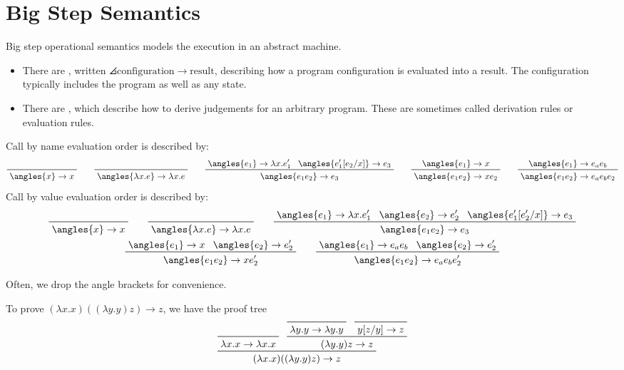 \documentclass[class=scrartcl]{standalone}
\begin{document}

\section{Big Step Semantics}
Big step operational semantics models the execution in an abstract machine.
\begin{itemize}
  \item There are ,
        written \(\angles{\text{configuration}} \to \text{result}\),
        describing how a program configuration is evaluated into a result.
        The configuration typically includes the program as well as any state.
  \item There are ,
        which describe how to derive judgements for an arbitrary program.
        These are sometimes called derivation rules or evaluation rules.
\end{itemize}

\begin{example}
  Call by name evaluation order is described by:
  \[
    \prfaxiom{\angles{x} \to x} \qquad
    \prfaxiom{\angles{\lambda x. e} \to \lambda x. e} \qquad
    \prftree{\angles{e_1} \to \lambda x. e_1'}
            {\angles{e_1'[e_2 / x]} \to e_3}
            {\angles{e_1 e_2} \to e_3} \qquad
    \prftree{\angles{e_1} \to x}
            {\angles{e_1 e_2} \to x e_2} \qquad
    \prftree{\angles{e_1} \to e_a e_b}
            {\angles{e_1 e_2} \to e_a e_b e_2}
  \]
  Call by value evaluation order is described by:
  \begin{gather*}
    \prfaxiom{\angles{x} \to x} \qquad
    \prfaxiom{\angles{\lambda x. e} \to \lambda x. e} \qquad
    \prftree{\angles{e_1} \to \lambda x. e_1'}
            {\angles{e_2} \to e_2'}
            {\angles{e_1'[e_2' / x]} \to e_3}
            {\angles{e_1 e_2} \to e_3}\\
    \prftree{\angles{e_1} \to x}
            {\angles{e_2} \to e_2'}
            {\angles{e_1 e_2} \to x e_2'} \qquad
    \prftree{\angles{e_1} \to e_a e_b}
            {\angles{e_2} \to e_2'}
            {\angles{e_1 e_2} \to e_a e_b e_2'}
  \end{gather*}
\end{example}
Often, we drop the angle brackets for convenience.

\begin{example}
  To prove \((\lambda x. x)((\lambda y.y) z) \to z\), we have the proof tree
  \[
    \prftree{\prfaxiom{\lambda x. x \to \lambda x. x}}
            {\prftree{\prfaxiom{\lambda y. y \to \lambda y. y}}
                     {\prfaxiom{y[z / y] \to z}}
                     {(\lambda y. y) z \to z}
            }
            {(\lambda x. x)((\lambda y.y) z) \to z}
  \]
\end{example}
\end{document}
